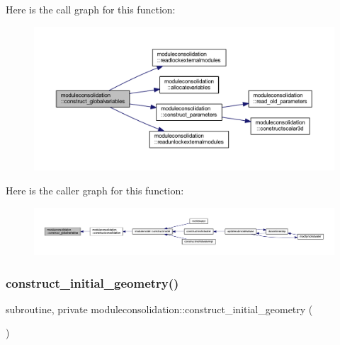 Here is the call graph for this function\+:\nopagebreak
\begin{figure}[H]
\begin{center}
\leavevmode
\includegraphics[width=350pt]{namespacemoduleconsolidation_a4d351c8e79499df7d1edcdc11c64fd58_cgraph}
\end{center}
\end{figure}
Here is the caller graph for this function\+:\nopagebreak
\begin{figure}[H]
\begin{center}
\leavevmode
\includegraphics[width=350pt]{namespacemoduleconsolidation_a4d351c8e79499df7d1edcdc11c64fd58_icgraph}
\end{center}
\end{figure}
\mbox{\label{namespacemoduleconsolidation_aefbb1dd3cecd84ab6814af87893b00d1}} 
\subsubsection{\texorpdfstring{construct\+\_\+initial\+\_\+geometry()}{construct\_initial\_geometry()}}
{\footnotesize\ttfamily subroutine, private moduleconsolidation\+::construct\+\_\+initial\+\_\+geometry (\begin{DoxyParamCaption}{ }\end{DoxyParamCaption})\hspace{0.3cm}{\ttfamily [private]}}

